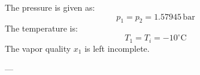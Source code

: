 The pressure is given as:  
\[
p_1 = p_2 = 1.57945 \, \text{bar}
\]  
The temperature is:  
\[
T_1 = T_i = -10^\circ\text{C}
\]  
The vapor quality \( x_1 \) is left incomplete.

---